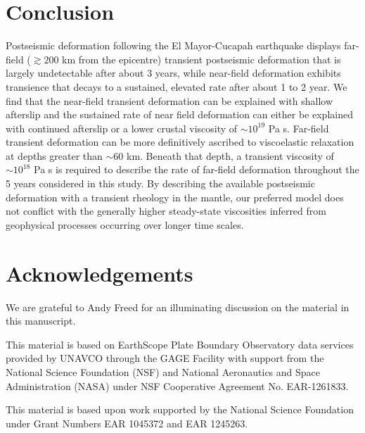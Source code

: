 \documentclass[review]{elsarticle}
\begin{document}
\section{Conclusion}
Postseismic deformation following the El Mayor-Cucapah earthquake displays far-field ($\gtrsim 200$ km from the epicentre) transient postseismic deformation that is largely undetectable after about 3 years, while near-field deformation exhibits transience that decays to a sustained, elevated rate after about 1 to 2 year.  We find that the near-field transient deformation can be explained with shallow afterslip and the sustained rate of near field deformation can either be explained with continued afterslip or a lower crustal viscosity of $\sim10^{19}$ Pa s.  Far-field transient deformation can be more definitively ascribed to viscoelastic relaxation at depths greater than $\sim60$ km. Beneath that depth, a transient viscosity of $\sim10^{18}$ Pa s is required to describe the rate of far-field deformation throughout the 5 years considered in this study.  By describing the available postseismic deformation with a transient rheology in the mantle, our preferred model does not conflict with the generally higher steady-state viscosities inferred from geophysical processes occurring over longer time scales.           

\section*{Acknowledgements}
We are grateful to Andy Freed for an illuminating discussion on the material in this manuscript.  
 
This material is based on EarthScope Plate Boundary Observatory data services provided by UNAVCO through the GAGE Facility with support from the National Science Foundation (NSF) and National Aeronautics and Space Administration (NASA) under NSF Cooperative Agreement No. EAR-1261833.

This material is based upon work supported by the National Science
Foundation under Grant Numbers EAR 1045372 and EAR 1245263.








 


 

 
\end{document}
